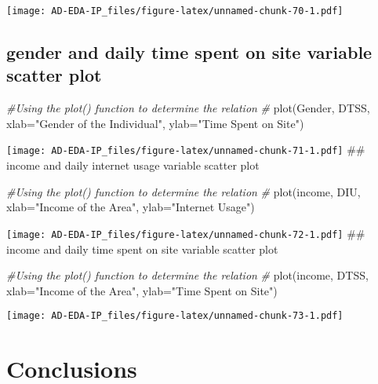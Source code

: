 \documentclass[
]{article}
\newenvironment{Shaded}{\begin{snugshade}}{\end{snugshade}}
\newcommand{\AttributeTok}[1]{\textcolor[rgb]{0.77,0.63,0.00}{#1}}
\newcommand{\CommentTok}[1]{\textcolor[rgb]{0.56,0.35,0.01}{\textit{#1}}}
\newcommand{\FunctionTok}[1]{\textcolor[rgb]{0.00,0.00,0.00}{#1}}
\newcommand{\NormalTok}[1]{#1}
\newcommand{\StringTok}[1]{\textcolor[rgb]{0.31,0.60,0.02}{#1}}
\begin{document}
\texttt{[image: AD-EDA-IP\_files/figure-latex/unnamed-chunk-70-1.pdf]}

\hypertarget{gender-and-daily-time-spent-on-site-variable-scatter-plot}{%
\subsection{gender and daily time spent on site variable scatter
plot}\label{gender-and-daily-time-spent-on-site-variable-scatter-plot}}

\begin{Shaded}
\begin{Highlighting}[]
\CommentTok{\#Using the plot() function to determine the relation }
\CommentTok{\#}
\FunctionTok{plot}\NormalTok{(Gender, DTSS, }\AttributeTok{xlab=}\StringTok{"Gender of the Individual"}\NormalTok{, }\AttributeTok{ylab=}\StringTok{"Time Spent on Site"}\NormalTok{)}
\end{Highlighting}
\end{Shaded}

\texttt{[image: AD-EDA-IP\_files/figure-latex/unnamed-chunk-71-1.pdf]}
\#\# income and daily internet usage variable scatter plot

\begin{Shaded}
\begin{Highlighting}[]
\CommentTok{\#Using the plot() function to determine the relation }
\CommentTok{\#}
\FunctionTok{plot}\NormalTok{(income, DIU, }\AttributeTok{xlab=}\StringTok{"Income of the Area"}\NormalTok{, }\AttributeTok{ylab=}\StringTok{"Internet Usage"}\NormalTok{)}
\end{Highlighting}
\end{Shaded}

\texttt{[image: AD-EDA-IP\_files/figure-latex/unnamed-chunk-72-1.pdf]}
\#\# income and daily time spent on site variable scatter plot

\begin{Shaded}
\begin{Highlighting}[]
\CommentTok{\#Using the plot() function to determine the relation }
\CommentTok{\#}
\FunctionTok{plot}\NormalTok{(income, DTSS, }\AttributeTok{xlab=}\StringTok{"Income of the Area"}\NormalTok{, }\AttributeTok{ylab=}\StringTok{"Time Spent on Site"}\NormalTok{)}
\end{Highlighting}
\end{Shaded}

\texttt{[image: AD-EDA-IP\_files/figure-latex/unnamed-chunk-73-1.pdf]}

\hypertarget{conclusions}{%
\section{Conclusions}\label{conclusions}}
\end{document}

